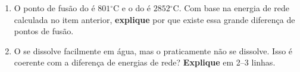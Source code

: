 \documentclass[10pt,a4paper]{article}
\newcommand{\oC}{$^\circ$C}
\begin{document}
\begin{enumerate}[label=\textbf{\alph*)}]
        \vspace{1cm}

  \item O ponto de fusão do  é $801$\oC{} e o do 
        é $2852$\oC. Com base na energia de rede calculada no item
        anterior, \textbf{explique} por que existe essa grande
        diferença de pontos de fusão.

        \vspace{3cm}

  \item O  se dissolve facilmente em água, mas o 
        praticamente não se dissolve. Isso é coerente com a diferença
        de energias de rede? \textbf{Explique} em 2--3 linhas.

        \vspace{3cm}

\end{enumerate}
\end{document}
